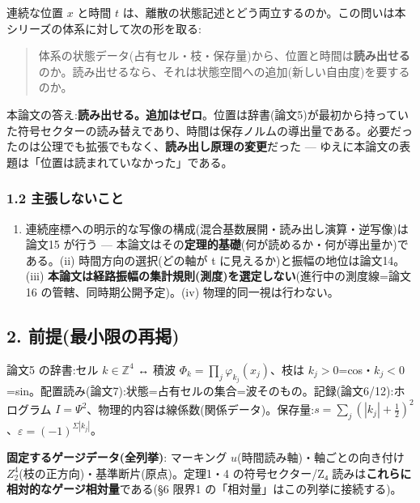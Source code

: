 \documentclass[
]{ltjsarticle}
\providecommand{\tightlist}{%
  \setlength{\itemsep}{0pt}\setlength{\parskip}{0pt}}
\begin{document}
連続な位置 \(x\) と時間 \(t\)
は、離散の状態記述とどう両立するのか。この問いは本シリーズの体系に対して次の形を取る:

\begin{quote}
体系の状態データ(占有セル・枝・保存量)から、位置と時間は\textbf{読み出せる}のか。読み出せるなら、それは状態空間への追加(新しい自由度)を要するのか。
\end{quote}

本論文の答え:\textbf{読み出せる。追加はゼロ}。位置は辞書(論文5)が最初から持っていた符号セクターの読み替えであり、時間は保存ノルムの導出量である。必要だったのは公理でも拡張でもなく、\textbf{読み出し原理の変更}だった
--- ゆえに本論文の表題は「位置は読まれていなかった」である。

\subsubsection{1.2
主張しないこと}\label{ux4e3bux5f35ux3057ux306aux3044ux3053ux3068}

\begin{enumerate}
\def\labelenumi{(\roman{enumi})}
\tightlist
\item
  連続座標への明示的な写像の構成(混合基数展開・読み出し演算・逆写像)は論文15
  が行う ---
  本論文はその\textbf{定理的基礎}(何が読めるか・何が導出量か)である。(ii)
  時間方向の選択(どの軸が t に見えるか)と振幅の地位は論文14。(iii)
  \textbf{本論文は経路振幅の集計規則(測度)を選定しない}(進行中の測度線=論文16
  の管轄、同時期公開予定)。(iv) 物理的同一視は行わない。
\end{enumerate}

\subsection{2.
前提(最小限の再掲)}\label{ux524dux63d0ux6700ux5c0fux9650ux306eux518dux63b2}

論文5 の辞書:セル \(k\in\mathbb{Z}^4\) ↔ 積波
\(\Phi_k=\prod_j\varphi_{k_j}(x_j)\)、枝は
\(k_j>0\)=cos・\(k_j<0\)=sin。配置読み(論文7):状態=占有セルの集合=波そのもの。記録(論文6/12):ホログラム
\(I=\Psi^2\)、物理的内容は線係数(関係データ)。保存量:\(s=\sum_j(|k_j|+\tfrac12)^2\)、\(\varepsilon=(-1)^{\Sigma|k_j|}\)。

\textbf{固定するゲージデータ(全列挙)}: マーキング
\(u\)(時間読み軸)・軸ごとの向き付け
\(Z_2^{4}\)(枝の正方向)・基準断片(原点)。定理1・4 の符号セクター/Z₄
読みは\textbf{これらに相対的なゲージ相対量}である(§6 限界1
の「相対量」はこの列挙に接続する)。
\end{document}
